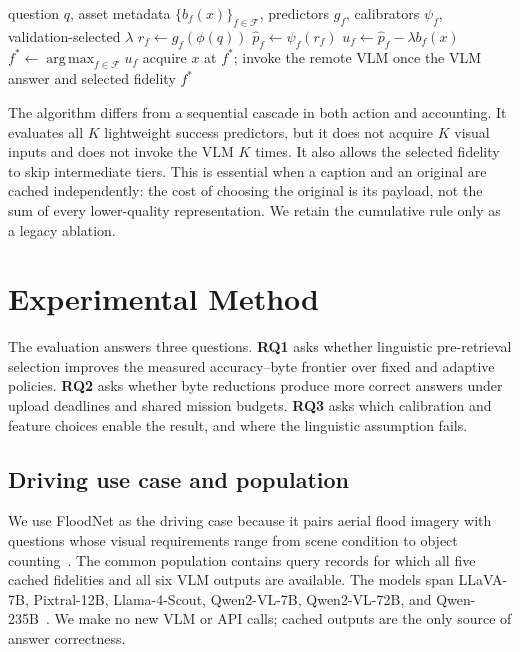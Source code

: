 \documentclass[10pt,conference]{IEEEtran}
\DeclareMathOperator*{\argmax}{arg\,max}
\newcommand{\system}{\textsc{VOILA}\xspace}
\newcommand{\fset}{\mathcal{F}}
\begin{document}
\begin{algorithm}[t]
\caption{\system pre-retrieval fidelity selection}
\label{alg:voila}
\begin{algorithmic}[1]
\Require question $q$, asset metadata $\{b_f(x)\}_{f\in\fset}$,
predictors $g_f$, calibrators $\psi_f$, validation-selected $\lambda$
\ForAll{$f\in\fset$}
  \State $r_f\gets g_f(\phi(q))$
  \State $\widehat p_f\gets\psi_f(r_f)$
  \State $u_f\gets\widehat p_f-\lambda b_f(x)$
\EndFor
\State $f^*\gets\argmax_{f\in\fset}u_f$
\State acquire $x$ at $f^*$; invoke the remote VLM once
\State \Return the VLM answer and selected fidelity $f^*$
\end{algorithmic}
\end{algorithm}

The algorithm differs from a sequential cascade in both action and accounting.
It evaluates all $K$ lightweight success predictors, but it does not acquire
$K$ visual inputs and does not invoke the VLM $K$ times. It also allows the
selected fidelity to skip intermediate tiers. This is essential when a caption
and an original are cached independently: the cost of choosing the original is
its payload, not the sum of every lower-quality representation. We retain the
cumulative rule only as a legacy ablation.

\section{Experimental Method}
\label{sec:evaluation}

The evaluation answers three questions. \textbf{RQ1} asks whether linguistic
pre-retrieval selection improves the measured accuracy--byte frontier over
fixed and adaptive policies. \textbf{RQ2} asks whether byte reductions produce
more correct answers under upload deadlines and shared mission budgets.
\textbf{RQ3} asks which calibration and feature choices enable the result, and
where the linguistic assumption fails.

\subsection{Driving use case and population}

We use FloodNet as the driving case because it pairs aerial flood imagery with
questions whose visual requirements range from scene condition to object
counting~\cite{rahnemoonfar2021floodnet}. The common population contains
\PopulationSize{} query records for which all five cached fidelities and all six
VLM outputs are available. The models span LLaVA-7B, Pixtral-12B, Llama-4-Scout,
Qwen2-VL-7B, Qwen2-VL-72B, and Qwen-235B~\cite{zhou2024tinyllava,pixtral2024,
abdullah2025evolutionmetasllamamodels,Qwen2VL,bai2023qwen}. We make no new VLM
or API calls; cached outputs are the only source of answer correctness.
\end{document}
